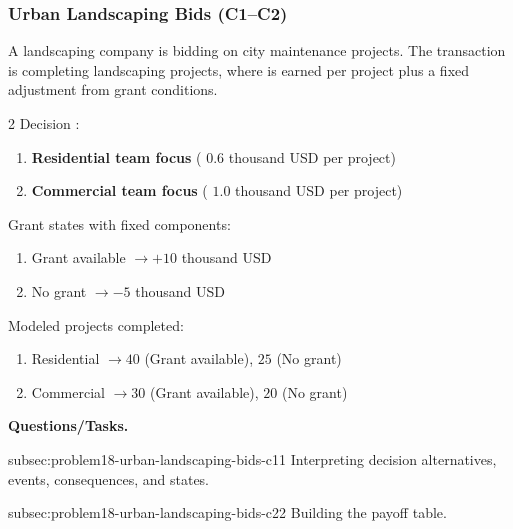 
	\subsubsection{Urban Landscaping Bids (C1--C2)}
	\label{sec:problem18-urban-landscaping-bids-c1-c2}
	A landscaping company is bidding on city maintenance projects. The transaction is completing landscaping projects, where  is earned per project plus a fixed  adjustment from grant conditions.

	\begin{multicols}{2}
		Decision :
		\begin{enumerate}[label=\arabic*.]
			\item \textbf{Residential team focus} ( $0.6$ thousand USD per project)
			\item \textbf{Commercial team focus} ( $1.0$ thousand USD per project)
		\end{enumerate}

		Grant states with fixed  components:
		\begin{enumerate}[label=\arabic*.]
			\item Grant available $\to +10$ thousand USD
			\item No grant $\to -5$ thousand USD
		\end{enumerate}

			\columnbreak

		Modeled projects completed:
		\begin{enumerate}[label=\arabic*.]
			\item Residential $\to 40$ (Grant available), $25$ (No grant)
			\item Commercial $\to 30$ (Grant available), $20$ (No grant)
		\end{enumerate}
	\end{multicols}

	\textbf{Questions/Tasks.}
	\begin{enumerate}
		\CriterionTask
		{subsec:problem18-urban-landscaping-bids-c1}{1}
		{Interpreting decision alternatives, events, consequences, and states.}

		\CriterionTask
		{subsec:problem18-urban-landscaping-bids-c2}{2}
		{Building the payoff table.}
	\end{enumerate}

